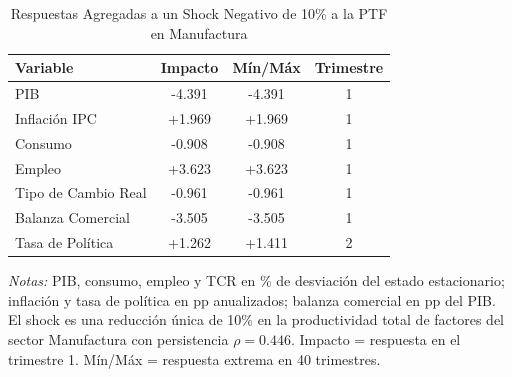 \begin{table}[htbp]
\centering
\caption{Respuestas Agregadas a un Shock Negativo de 10\% a la PTF en Manufactura}
\label{tab:mfg_agg}
\begin{threeparttable}
\begin{tabular}{@{}l c c c@{}}
\toprule
Variable & Impacto & Mín/Máx & Trimestre \\
\midrule
PIB & -4.391 & -4.391 & 1 \\
Inflación IPC & +1.969 & +1.969 & 1 \\
Consumo & -0.908 & -0.908 & 1 \\
Empleo & +3.623 & +3.623 & 1 \\
Tipo de Cambio Real & -0.961 & -0.961 & 1 \\
Balanza Comercial & -3.505 & -3.505 & 1 \\
Tasa de Política & +1.262 & +1.411 & 2 \\
\bottomrule
\end{tabular}
\begin{tablenotes}[flushleft]
\footnotesize
\item \textit{Notas:} PIB, consumo, empleo y TCR en \% de desviación del estado estacionario; inflación y tasa de política en pp anualizados; balanza comercial en pp del PIB. El shock es una reducción única de 10\% en la productividad total de factores del sector Manufactura con persistencia $\rho = 0.446$. Impacto = respuesta en el trimestre 1. Mín/Máx = respuesta extrema en 40 trimestres.
\end{tablenotes}
\end{threeparttable}
\end{table}
